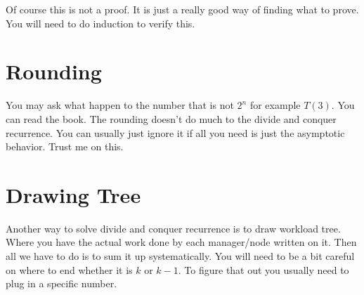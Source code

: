 \documentclass[a4paper, 12pt]{article}
\begin{document}
\begin{multicols}{2}
Of course this is not a proof. It is just a really good way of finding what to prove. You will need to do induction to verify this.


\section*{Rounding}

You may ask what happen to the number that is not $2^n$ for example $T(3)$. You can read the book. The rounding doesn't do much to the divide and conquer recurrence. You can usually just ignore it if all you need is just the asymptotic behavior. Trust me on this.
\end{multicols}

\section*{Drawing Tree}
Another way to solve divide and conquer recurrence is to draw workload tree. Where you have the actual work done by each manager/node written on it. Then all we have to do is to sum it up systematically. You will need to be a bit careful on where to end whether it is $k$ or $k-1$. To figure that out you usually need to plug in a specific number.
\end{document}
